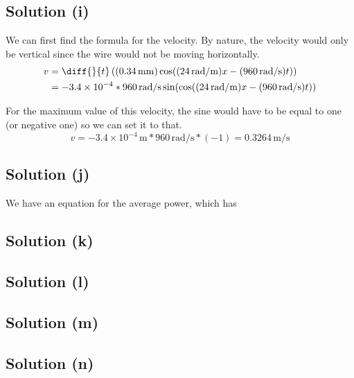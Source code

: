 \documentclass[12pt]{article}
\newcommand{\E}[1]{\times 10^{#1}}
\begin{document}
        \subsection{Solution (i)}
            We can first find the formula for the velocity.
            By nature, the velocity would only be vertical since the wire would not be moving horizontally.
            \begin{align}
                v   &=  \diff{}{t}\left( (0.34\,\unit{\milli\meter}) \cos((24\,\unit{\radian/\meter})x - (960\,\unit{\radian/\second})t) \right)\\
                    &=  - 3.4\E{-4} * 960\,\unit{\radian/\second} \sin(\cos((24\,\unit{\radian/\meter})x - (960\,\unit{\radian/\second})t))
            \end{align}

            For the maximum value of this velocity, the sine would have to be equal to one (or negative one) so we can set it to that.
            \begin{equation}
                v   =   -3.4\E{-4}\,\unit{\meter} * 960\,\unit{\radian/\second} * (-1)
                    =   \boxed{0.3264\,\unit{\meter/\second}}
            \end{equation}

        \subsection{Solution (j)}
            We have an equation for the average power, which has 

        \subsection{Solution (k)}

        \subsection{Solution (l)}

        \subsection{Solution (m)}

        \subsection{Solution (n)}
\end{document}
